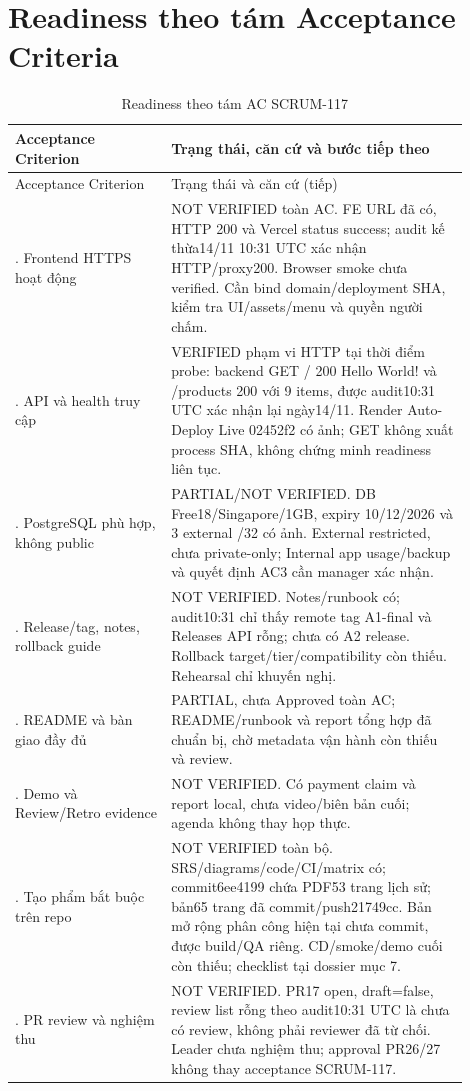 \section{Readiness theo tám Acceptance Criteria}
\label{sec:release-readiness}
\begin{longtable}{>{\raggedright\arraybackslash}p{0.31\linewidth}>{\raggedright\arraybackslash}p{0.59\linewidth}}
\caption{Readiness theo tám AC SCRUM-117}\\
\toprule
Acceptance Criterion & Trạng thái, căn cứ và bước tiếp theo \\
\midrule
\endfirsthead
\toprule Acceptance Criterion & Trạng thái và căn cứ (tiếp) \\
\midrule \endhead
1. Frontend HTTPS hoạt động & NOT VERIFIED toàn AC. FE URL đã có, HTTP 200
và Vercel status success; audit kế thừa14/11 10:31 UTC xác nhận HTTP/proxy200.
Browser smoke chưa verified. Cần bind domain/deployment SHA,
kiểm tra UI/assets/menu và quyền người chấm. \\
2. API và health truy cập & VERIFIED phạm vi HTTP tại thời điểm probe:
backend GET / 200 Hello World! và /products 200 với 9 items, được audit10:31 UTC
xác nhận lại ngày14/11. Render Auto-Deploy
Live 02452f2 có ảnh; GET không xuất process SHA, không chứng minh readiness liên tục. \\
3. PostgreSQL phù hợp, không public & PARTIAL/NOT VERIFIED. DB Free18/Singapore/1GB,
expiry 10/12/2026 và 3 external /32 có ảnh. External restricted, chưa private-only;
Internal app usage/backup và quyết định AC3 cần manager xác nhận. \\
4. Release/tag, notes, rollback guide & NOT VERIFIED. Notes/runbook có;
audit10:31 chỉ thấy remote tag A1-final và Releases API rỗng; chưa có A2 release.
Rollback target/tier/compatibility còn thiếu.
Rehearsal chỉ khuyến nghị. \\
5. README và bàn giao đầy đủ & PARTIAL, chưa Approved toàn AC; README/runbook và report tổng hợp
đã chuẩn bị, chờ metadata vận hành còn thiếu và review. \\
6. Demo và Review/Retro evidence & NOT VERIFIED. Có payment claim và report local,
chưa video/biên bản cuối; agenda không thay họp thực. \\
7. Tạo phẩm bắt buộc trên repo & NOT VERIFIED toàn bộ. SRS/diagrams/code/CI/matrix
có; commit6ee4199 chứa PDF53 trang lịch sử; bản65 trang đã commit/push21749cc.
Bản mở rộng phân công hiện tại chưa commit, được build/QA riêng. CD/smoke/demo cuối còn thiếu; checklist tại dossier mục 7. \\
8. PR review và nghiệm thu & NOT VERIFIED. PR17 open, draft=false, review list
rỗng theo audit10:31 UTC là chưa có review, không phải reviewer đã từ chối.
Leader chưa nghiệm thu; approval PR26/27 không thay acceptance SCRUM-117. \\
\bottomrule
\end{longtable}
